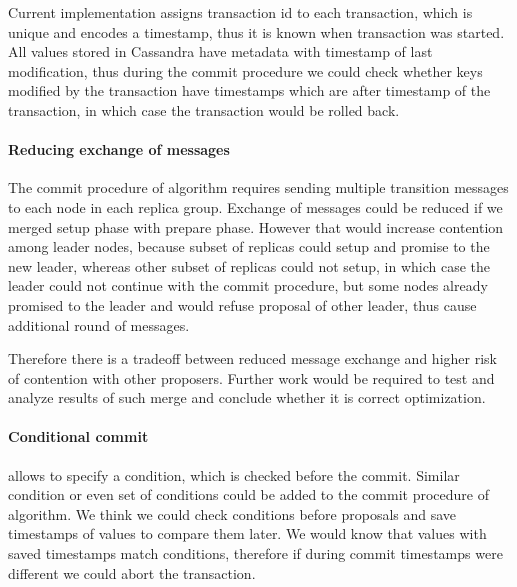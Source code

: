 Current implementation assigns transaction id to each transaction, which is unique and encodes a timestamp, thus it is known when transaction was started. All values stored in Cassandra have metadata with timestamp of last modification, thus during the commit procedure we could check whether keys modified by the transaction have timestamps which are after timestamp of the transaction, in which case the transaction would be rolled back.

\paragraph{Reducing exchange of messages}
The commit procedure of \mpt algorithm requires sending multiple transition messages to each node in each replica group. Exchange of messages could be reduced if we merged setup phase with prepare phase. However that would increase contention among leader nodes, because subset of replicas could setup and promise to the new leader, whereas other subset of replicas could not setup, in which case the leader could not continue with the commit procedure, but some nodes already promised to the leader and would refuse proposal of other leader, thus cause additional round of messages. 

Therefore there is a tradeoff between reduced message exchange and higher risk of contention with other proposers. Further work would be required to test and analyze results of such merge and conclude whether it is correct optimization.


\paragraph{Conditional commit}
\lwt allows to specify a condition, which is checked before the commit. Similar condition or even set of conditions could be added to the commit procedure of \mpt algorithm. We think we could check conditions before proposals and save timestamps of values to compare them later. We would know that values with saved timestamps match conditions, therefore if during commit timestamps were different we could abort the transaction.

